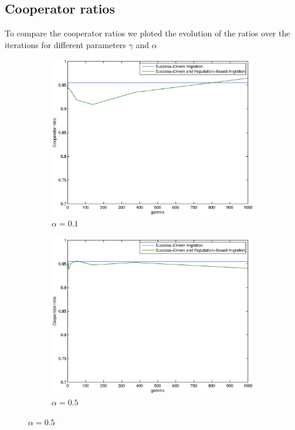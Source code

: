 \documentclass[11pt]{article}
\begin{document}
\subsection{Cooperator ratios}

To compare the cooperator ratios we ploted the evolution of the ratios over the iterations for different parameters $\gamma$ and $\alpha$

\begin{figure}[h]
	\centering
	\begin{subfigure}[t]{0.48\textwidth}
        \includegraphics[width=\textwidth]{../../other/plots/alpha01.eps}
	\caption{$\alpha = 0.1$}
	\label{fig:cooperator_ratios_5000-1}
    	\end{subfigure}
	\begin{subfigure}[t]{0.48\textwidth}
        \includegraphics[width=\textwidth]{../../other/plots/alpha05.eps}
	\caption{$\alpha = 0.5$}
	\label{fig:cooperator_ratios_5000-2}
    	\end{subfigure}


\end{figure}
\end{document}
